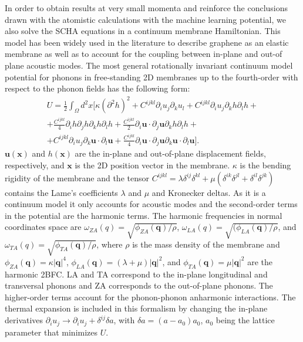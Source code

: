 In order to obtain results at very small momenta and reinforce the conclusions drawn with the atomistic calculations 
with the machine learning potential, we also solve the SCHA equations in a continuum membrane Hamiltonian. This model 
has been widely used in the literature to describe graphene as an elastic membrane as well as to account for the 
coupling between in-plane and out-of plane acoustic 
modes\cite{mariani2008flexural,amorim2014thermodynamics,de2012bending}. The most general rotationally invariant 
continuum model potential for phonons in free-standing 2D membranes up to the fourth-order with respect to the 
phonon fields has the following form:
\begin{multline}
 \label{membrane-potential}
 U=\frac{1}{2}\int_{\Omega}d^{2}x[\kappa(\partial^{2}h)^{2}+C^{ijkl}\partial_{i}u_{j}\partial_{k}u_{l}+C^{ijkl}\partial_{i}u_{j}\partial_{k}h\partial_{l}h+\\ +\frac{C^{ijkl}}{4}\partial_{i}h\partial_{j}h\partial_{
 k}h\partial_{l}h+\frac{C^{ijkl}}{2}\partial_{i}\boldsymbol{u}\cdot\partial_{j}\boldsymbol{u}\partial_{k}h\partial_{l}h+\\+C^{ijkl}\partial_{i}u_{j}\partial_{k}\boldsymbol{u}\cdot\partial_{l}\boldsymbol{u}+
 \frac{C^{ijkl}}{4}\partial_{i}\boldsymbol{u}\cdot\partial_{j}\boldsymbol{u}\partial_{k}\boldsymbol{u}\cdot\partial_{l}\boldsymbol{u}].
\end{multline}
$\boldsymbol{u}(\boldsymbol{x})$ and $h(\boldsymbol{x})$ are the in-plane and out-of-plane displacement 
fields, respectively, and $\boldsymbol{x}$ is the 2D position vector in the membrane. $\kappa$ is the bending 
rigidity of the membrane and the tensor 
$C^{ijkl}=\lambda\delta^{ij}\delta^{kl}+\mu(\delta^{ik}\delta^{jl}+\delta^{il}\delta^{jk})$ contains the Lame's 
coefficients $\lambda$ and $\mu$ and Kronecker deltas. As it is a continuum model it only accounts for acoustic 
modes and the second-order terms in the potential are the harmonic terms. The harmonic frequencies in normal 
coordinates space are $\omega_{ZA}(q)=\sqrt{\phi_{ZA}(\boldsymbol{q})/\rho}$, 
$\omega_{LA}(q)=\sqrt{(\phi_{LA}(\boldsymbol{q})/\rho}$, and 
$\omega_{TA}(q)=\sqrt{\phi_{TA}(\boldsymbol{q})/\rho}$, where $\rho$ is the mass density of the membrane and 
$\phi_{ZA}(\boldsymbol{q})=\kappa |\boldsymbol{q}|^{4}$, 
$\phi_{LA}(\boldsymbol{q})=(\lambda+\mu)|\boldsymbol{q}|^{2}$, and
$\phi_{TA}(\boldsymbol{q})=\mu|\boldsymbol{q}|^{2}$ are the harmonic 2BFC. LA and TA correspond to the in-plane 
longitudinal and transversal phonons and ZA corresponds to the out-of-plane phonons. The higher-order terms account 
for the phonon-phonon anharmonic interactions. The thermal expansion is included in this formalism by changing the 
in-plane derivatives $\partial_{i}u_{j}\rightarrow \partial_{i}u_{j}+\delta^{ij}\delta a$, with 
$\delta a=(a-a_{0})a_{0}$, $a_{0}$ being the lattice parameter that minimizes $U$. \\

